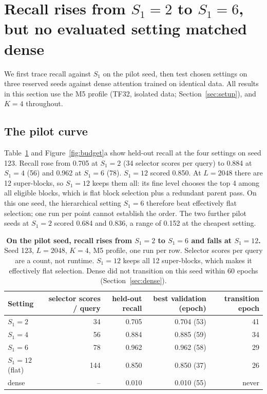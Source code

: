 \section{Recall rises from $S_1{=}2$ to $S_1{=}6$, but no evaluated setting matched dense}
\label{sec:budget}

We first trace recall against $S_1$ on the pilot seed, then test chosen settings on three reserved seeds against
dense attention trained on identical data. All results in this section use the M5 profile (TF32, isolated data;
Section~\ref{sec:setup}), and $K{=}4$ throughout.

\subsection{The pilot curve}

Table~\ref{tab:budget} and Figure~\ref{fig:budget}a show held-out recall at the four settings on seed 123. Recall rose
from 0.705 at $S_1{=}2$ (34 selector scores per query) to 0.884 at $S_1{=}4$ (56) and 0.962 at $S_1{=}6$ (78).
$S_1{=}12$ scored 0.850. At $L{=}2048$ there are 12 super-blocks, so $S_1{=}12$ keeps them all: its fine level chooses
the top 4 among all eligible blocks, which is flat block selection plus a redundant parent pass. On this one seed, the
hierarchical setting $S_1{=}6$ therefore beat effectively flat selection; one run per point cannot establish the order.
The two further pilot seeds at $S_1{=}2$ scored 0.684 and 0.836, a range of 0.152 at the cheapest setting.

\begin{table}[t]
\centering
\small
\begin{tabular}{lrrrr}
\toprule
Setting & selector scores / query & held-out recall & best validation (epoch) & transition epoch \\
\midrule
$S_1{=}2$  & 34  & 0.705 & 0.704 (53) & 41 \\
$S_1{=}4$  & 56  & 0.884 & 0.885 (59) & 34 \\
$S_1{=}6$  & 78  & 0.962 & 0.962 (58) & 29 \\
$S_1{=}12$ (flat) & 144 & 0.850 & 0.850 (37) & 26 \\
dense      & -- & 0.010 & 0.010 (55) & never \\
\bottomrule
\end{tabular}
\caption{\textbf{On the pilot seed, recall rises from $S_1{=}2$ to $S_1{=}6$ and falls at $S_1{=}12$.} Seed 123,
$L{=}2048$, $K{=}4$, M5 profile, one run per row. Selector scores per query are a count, not runtime. $S_1{=}12$ keeps
all 12 super-blocks, which makes it effectively flat selection. Dense did not transition on this seed within 60
epochs (Section~\ref{sec:dense}).}
\label{tab:budget}
\end{table}


